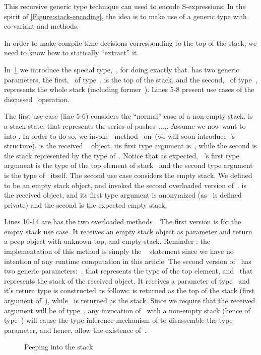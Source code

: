This recursive generic type technique can used to encode S-expressions: In the spirit of
  \cref{Figure:stack-encoding}, the idea is to make use of a  generic type
  with co-variant  and  methods.

In order to make compile-time decisions corresponding to the top of the stack, 
  we need to know how to statically ``extract'' it.

In~\cref{Figure:peep} we introduce the special type,~, for doing exactly that.
 has two generic parameters, the first,~ of type~, is the top of the stack,
  and the second,~ of type~, represents the whole stack (including former~).
Lines 5-8 present use cases of the discussed~ operation.

The first use case (line 5-6) considers the ``normal'' case of a non-empty stack.
 is a stack state, that represents the series 
  of pushes~,,,,.
Assume we now want to~ into .
In order to do so, we invoke~ method~ on~(we will soon introduce~'s structure).
 is the received ~ object, its first type argument is~,
  while the second is the stack represented by the type of~.
Notice that as expected, ~'s first type argument is the type of the top element of stack~
  and the second type argument is the type of~ itself.
The second use case considers the empty stack. 
We defined  to be an empty stack object, and invoked the second overloaded version of~.
 is the received object, and its first type argument is anonymized (as~ is defined private)
and the second is the expected empty stack.

Lines 10-14 are has the two overloaded methods~.
The first version is for the empty stack use case.
It receives an empty stack object as parameter and return a peep object with unknown top, and empty stack.
Reminder : the implementation of this method is simply the ~ statement since
  we have no intention of any runtime computation in this article.
The second version of~ has two generic 
  parameters:~, that represents the type of the top element,
  and~ that represents the stack of the received object.
It receives a parameter of type~ and
  it's return type is constructed as follows: 
   is returned as the top of the stack (first argument of~),
  while~ is returned as the stack.
Since we require that the received argument
  will be of type~,
  any invocation of~ with a non-empty stack (hence of type~) 
  will cause the type-inference mechanism of \Java to disassemble the type parameter, 
  and hence, allow the existence of~.

  
\begin{figure}[htb]%
  \caption{Peeping into the stack}%
  \label{Figure:peep}%
  \lstset{style=numbered}
\end{figure}
